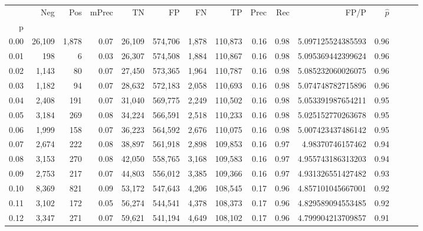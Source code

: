 \begin{tabular}{rrrrrrrrrrrrrrr}
\toprule
{} &     Neg &    Pos & mPrec &       TN &       FP &       FN &       TP &  Prec &   Rec &                  FP/P & $\hat{p}$ \\
p    &         &        &       &          &          &          &          &       &       &                       &           \\
\midrule
0.00 &  26,109 &  1,878 &  0.07 &   26,109 &  574,706 &    1,878 &  110,873 &  0.16 &  0.98 &     5.097125524385593 &      0.96 \\
0.01 &     198 &      6 &  0.03 &   26,307 &  574,508 &    1,884 &  110,867 &  0.16 &  0.98 &     5.095369442399624 &      0.96 \\
0.02 &   1,143 &     80 &  0.07 &   27,450 &  573,365 &    1,964 &  110,787 &  0.16 &  0.98 &     5.085232060026075 &      0.96 \\
0.03 &   1,182 &     94 &  0.07 &   28,632 &  572,183 &    2,058 &  110,693 &  0.16 &  0.98 &     5.074748782715896 &      0.96 \\
0.04 &   2,408 &    191 &  0.07 &   31,040 &  569,775 &    2,249 &  110,502 &  0.16 &  0.98 &     5.053391987654211 &      0.95 \\
0.05 &   3,184 &    269 &  0.08 &   34,224 &  566,591 &    2,518 &  110,233 &  0.16 &  0.98 &     5.025152770263678 &      0.95 \\
0.06 &   1,999 &    158 &  0.07 &   36,223 &  564,592 &    2,676 &  110,075 &  0.16 &  0.98 &     5.007423437486142 &      0.95 \\
0.07 &   2,674 &    222 &  0.08 &   38,897 &  561,918 &    2,898 &  109,853 &  0.16 &  0.97 &      4.98370746157462 &      0.94 \\
0.08 &   3,153 &    270 &  0.08 &   42,050 &  558,765 &    3,168 &  109,583 &  0.16 &  0.97 &     4.955743186313203 &      0.94 \\
0.09 &   2,753 &    217 &  0.07 &   44,803 &  556,012 &    3,385 &  109,366 &  0.16 &  0.97 &     4.931326551427482 &      0.93 \\
0.10 &   8,369 &    821 &  0.09 &   53,172 &  547,643 &    4,206 &  108,545 &  0.17 &  0.96 &     4.857101045667001 &      0.92 \\
0.11 &   3,102 &    172 &  0.05 &   56,274 &  544,541 &    4,378 &  108,373 &  0.17 &  0.96 &     4.829589094553485 &      0.92 \\
0.12 &   3,347 &    271 &  0.07 &   59,621 &  541,194 &    4,649 &  108,102 &  0.17 &  0.96 &     4.799904213709857 &      0.91 \\

\end{tabular}
